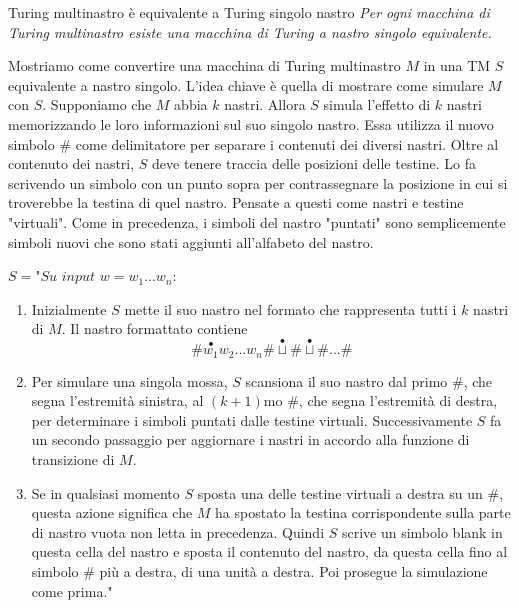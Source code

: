 \begin{Thm}{Turing multinastro è equivalente a Turing singolo nastro}{}\label{thm:Tmulti-TM}
\textit{Per ogni macchina di Turing multinastro esiste una macchina di Turing a nastro singolo equivalente.}

\begin{demonstration}
Mostriamo come convertire una macchina di Turing multinastro $M$ in una TM $S$ equivalente a nastro singolo. L'idea chiave è quella di mostrare come simulare $M$ con $S$. Supponiamo che $M$ abbia $k$ nastri. Allora $S$ simula l'effetto di $k$ nastri memorizzando le loro informazioni sul suo singolo nastro. Essa utilizza il nuovo simbolo $\#$ come delimitatore per separare i contenuti dei diversi nastri. Oltre al contenuto dei nastri, $S$ deve tenere traccia delle posizioni delle testine. Lo fa scrivendo un simbolo con un punto sopra per contrassegnare la posizione in cui si troverebbe la testina di quel nastro. Pensate a questi come nastri e testine "virtuali". Come in precedenza, i simboli del nastro "puntati" sono semplicemente simboli nuovi che sono stati aggiunti all'alfabeto del nastro. 

$S= \textit{"Su input }w = w_1... w_n$:
\begin{enumerate}
    \item Inizialmente $S$ mette il suo nastro nel formato che rappresenta tutti i $k$ nastri di $M$. Il nastro formattato contiene
    \begin{equation*}
        \# \overset{\bullet}{w_1}w_2...w_n\# \overset{\bullet}{\sqcup}\#\overset{\bullet}{\sqcup}\#...\#
    \end{equation*}
    \item Per simulare una singola mossa, $S$ scansiona il suo nastro dal primo $\#$, che segna l'estremità sinistra, al $(k+1)$mo $\#$, che segna l'estremità di destra, per determinare i simboli puntati dalle testine virtuali. Successivamente $S$ fa un secondo passaggio per aggiornare i nastri in accordo alla funzione di transizione di $M$.
    \item Se in qualsiasi momento $S$ sposta una delle testine virtuali a destra su un $\#$, questa azione significa che $M$ ha spostato la testina corrispondente sulla parte di nastro vuota non letta in precedenza. Quindi $S$ scrive un simbolo blank in questa cella del nastro e sposta il contenuto del nastro, da questa cella fino al simbolo $\#$ più a destra, di una unità a destra. Poi prosegue la simulazione come prima."
\end{enumerate}    
\end{demonstration}
\end{Thm}

